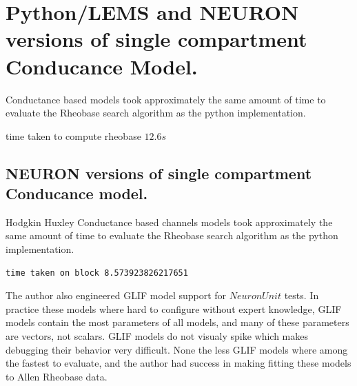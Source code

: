 \section{Python/LEMS and NEURON versions of single compartment Conducance Model.}

Conductance based models took approximately the same amount of
time to evaluate the Rheobase search algorithm as the python
implementation.


time taken to compute rheobase $ 12.6s $




\subsection{NEURON versions of single compartment Conducance
model.}

Hodgkin Huxley Conductance based channels models took approximately the same amount of time to evaluate the Rheobase search algorithm as the python implementation.



    \begin{verbatim}
time taken on block 8.573923826217651
    \end{verbatim}

The author also engineered GLIF model support for $NeuronUnit$ tests. In practice these models where hard to configure without expert knowledge, GLIF models contain the most parameters of all models, and many of these parameters are vectors, not scalars. GLIF models do not visualy spike which makes debugging their behavior very difficult. None the less GLIF models where among the fastest to evaluate, and the author had success in making fitting these models to Allen Rheobase data.

